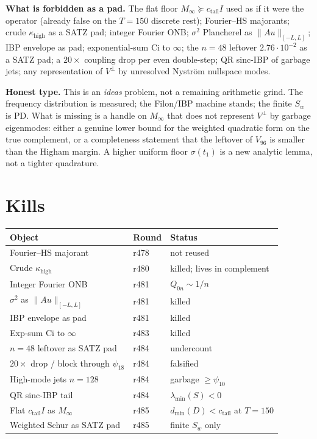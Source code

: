 \documentclass[11pt]{article}
\theoremstyle{remark}
\newcommand{\Minf}{M_{\infty}}
\begin{document}
\noindent\textbf{What is forbidden as a pad.}
The flat floor $\Minf\succeq c_{\mathrm{tail}}I$
used as if it were the operator
(already false on the $T=150$ discrete rest);
Fourier--HS majorants; crude $\kappa_{\mathrm{high}}$
as a SATZ pad; integer Fourier ONB;
$\sigma^2$ Plancherel as $\|Au\|_{[-L,L]}$;
IBP envelope as pad; exponential-sum Ci to $\infty$;
the $n=48$ leftover $2.76\cdot10^{-2}$ as a SATZ pad;
a $20\times$ coupling drop per even double-step;
QR sinc-IBP of garbage jets;
any representation of $V^\perp$ by unresolved
Nystr\"om nullspace modes.

\noindent\textbf{Honest type.}
This is an \emph{ideas} problem, not a remaining
arithmetic grind.
The frequency distribution is measured;
the Filon/IBP machine stands;
the finite $S_w$ is PD.
What is missing is a handle on $\Minf$ that does not
represent $V^\perp$ by garbage eigenmodes:
either a genuine lower bound for the weighted
quadratic form on the true complement, or a
completeness statement that the leftover of $V_{96}$
is smaller than the Higham margin.
A higher uniform floor $\sigma(t_1)$ is a new
analytic lemma, not a tighter quadrature.

\section{Kills}

\begin{center}
\small
\begin{tabular}{@{}lll@{}}
\toprule
Object & Round & Status \\
\midrule
Fourier--HS majorant & r478 & not reused \\
Crude $\kappa_{\mathrm{high}}$ & r480 & killed; lives in complement \\
Integer Fourier ONB & r481 & $Q_{0n}\sim1/n$ \\
$\sigma^2$ as $\|Au\|_{[-L,L]}$ & r481 & killed \\
IBP envelope as pad & r481 & killed \\
Exp-sum Ci to $\infty$ & r483 & killed \\
$n=48$ leftover as SATZ pad & r484 & undercount \\
$20\times$ drop / block through $\psi_{18}$ & r484 & falsified \\
High-mode jets $n=128$ & r484 & garbage $\ge\psi_{10}$ \\
QR sinc-IBP tail & r484 & $\lambda_{\min}(S)<0$ \\
Flat $c_{\mathrm{tail}}I$ as $\Minf$ & r485 & $d_{\min}(D)<c_{\mathrm{tail}}$ at $T=150$ \\
Weighted Schur as SATZ pad & r485 & finite $S_w$ only \\
\bottomrule
\end{tabular}
\end{center}
\end{document}
